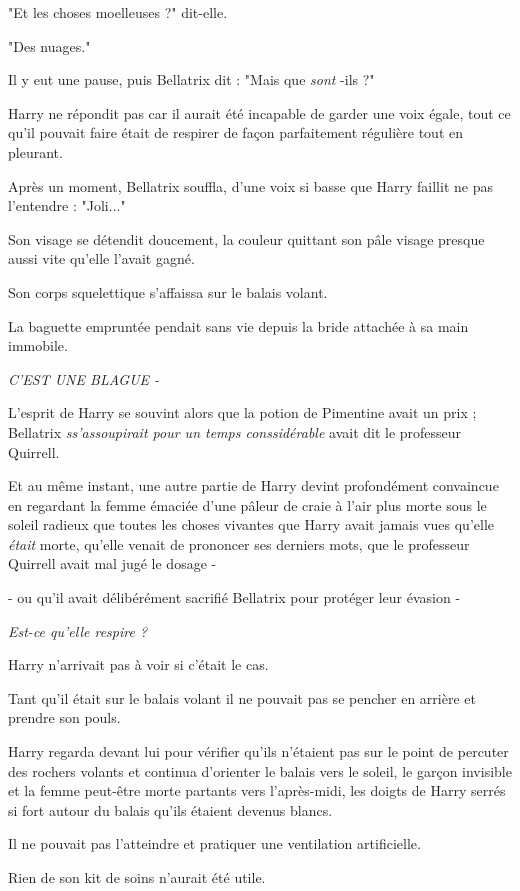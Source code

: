 "Et les choses moelleuses ?" dit-elle.

"Des nuages."

Il y eut une pause, puis Bellatrix dit : "Mais que \emph{sont} -ils ?"

Harry ne répondit pas car il aurait été incapable de garder une voix égale, tout ce qu'il pouvait faire était de respirer de façon parfaitement régulière tout en pleurant.

Après un moment, Bellatrix souffla, d'une voix si basse que Harry faillit ne pas l'entendre : "Joli..."

Son visage se détendit doucement, la couleur quittant son pâle visage presque aussi vite qu'elle l'avait gagné.

Son corps squelettique s'affaissa sur le balais volant.

La baguette empruntée pendait sans vie depuis la bride attachée à sa main immobile.

\emph{C'EST UNE BLAGUE -} 

L'esprit de Harry se souvint alors que la potion de Pimentine avait un prix ; Bellatrix \emph{ss'assoupirait pour un temps conssidérable}  avait dit le professeur Quirrell.

Et au même instant, une autre partie de Harry devint profondément convaincue en regardant la femme émaciée d'une pâleur de craie à l'air plus morte sous le soleil radieux que toutes les choses vivantes que Harry avait jamais vues qu'elle \emph{était}  morte, qu'elle venait de prononcer ses derniers mots, que le professeur Quirrell avait mal jugé le dosage -

- ou qu'il avait délibérément sacrifié Bellatrix pour protéger leur évasion -

\emph{Est-ce qu'elle respire ?} 

Harry n'arrivait pas à voir si c'était le cas.

Tant qu'il était sur le balais volant il ne pouvait pas se pencher en arrière et prendre son pouls.

Harry regarda devant lui pour vérifier qu'ils n'étaient pas sur le point de percuter des rochers volants et continua d'orienter le balais vers le soleil, le garçon invisible et la femme peut-être morte partants vers l'après-midi, les doigts de Harry serrés si fort autour du balais qu'ils étaient devenus blancs.

Il ne pouvait pas l'atteindre et pratiquer une ventilation artificielle.

Rien de son kit de soins n'aurait été utile.

